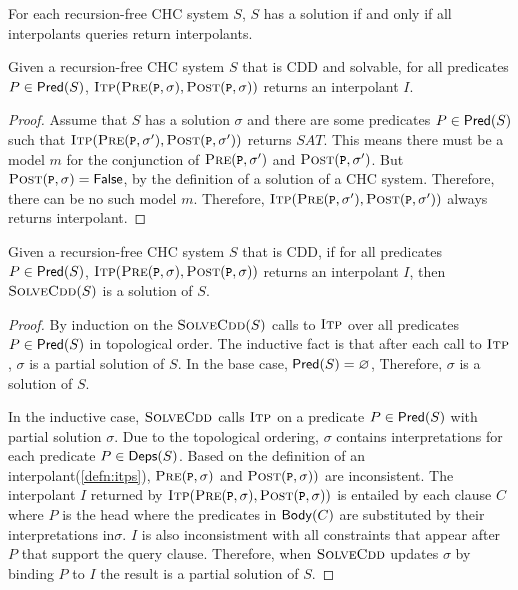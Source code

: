 For each recursion-free CHC system $S$, $S$ has a solution if and only
if all interpolants queries return interpolants.
%
\begin{lem}
  \label{lem:vc}
  Given a recursion-free CHC system $S$ that is CDD and solvable, for
  all predicates $P \in \mathsf{Pred}( S )$,
  $\solveitp(\prectr(\cc{P},\sigma),\postctr(\cc{P},\sigma))$ returns
  an interpolant $I$.
\end{lem}
%
\begin{proof}
  Assume that $S$ has a solution $\sigma$ and there are some
  predicates $P \in \mathsf{Pred}( S )$ such that
  $\solveitp(\prectr(\cc{P},\sigma'),\postctr(\cc{P},\sigma'))$
  returns $SAT$. This means there must be a model $m$ for the
  conjunction of $\prectr(\cc{P},\sigma')$ and
  $\postctr(\cc{P},\sigma')$.
  But $\postctr(\cc{P},\sigma) = \false$, by the definition of
  a solution of a CHC system.
  Therefore, there can be no such model $m$.
  Therefore,
  $\solveitp(\prectr(\cc{P},\sigma'),\postctr(\cc{P},\sigma'))$ always
  returns interpolant.
\end{proof}

\begin{lem}
  \label{lem:solve-aux}
  Given a recursion-free CHC system $S$ that is CDD, if for all
  predicates $P \in \mathsf{Pred}( S )$,
  $\solveitp(\prectr(\cc{P},\sigma),\postctr(\cc{P},\sigma))$ returns
  an interpolant $I$, then $\textsc{SolveCdd}(S)$ is a solution of $S$.
\end{lem}
%
\begin{proof}
  By induction on the $\textsc{SolveCdd}(S)$ calls to $\textsc{Itp}$ over all
  predicates $P \in \mathsf{Pred}( S )$
  in topological order.
  The inductive fact is that after each call to $\textsc{Itp}$, $\sigma$
  is a partial solution of $S$.
  In the base case, $\mathsf{Pred}( S ) = \varnothing$,
  Therefore, $\sigma$ is a solution of $S$.

  In the inductive case, $\textsc{SolveCdd}$ calls $\textsc{Itp}$ on a predicate
  $P \in \mathsf{Pred}( S )$ with partial solution $\sigma$.  Due to the
  topological ordering, $\sigma$ contains interpretations for each
  predicate $P \in \mathsf{Deps}(S)$.
  Based on the definition of an interpolant(\autoref{defn:itps}),
  $\prectr(\cc{P},\sigma)$ and $\postctr(\cc{P},\sigma))$ are
  inconsistent.
  The interpolant $I$ returned by
  $\solveitp(\prectr(\cc{P},\sigma),\postctr(\cc{P},\sigma))$ is
  entailed by each clause $C$ where $P$ is the head where the
  predicates in $\mathsf{Body}(C)$ are substituted by their interpretations
  in$\sigma$.
  $I$ is also inconsistment with all constraints that appear after $P$
  that support the query clause.
  Therefore, when $\textsc{SolveCdd}$ updates $\sigma$ by binding $P$ to $I$
  the result is a partial solution of $S$.
\end{proof}


